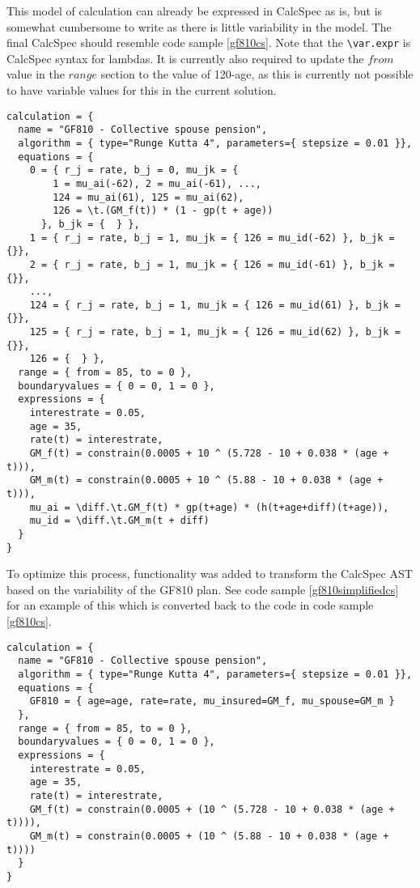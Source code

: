 This model of calculation can already be expressed in CalcSpec as is, but is somewhat cumbersome to write as there is little variability in the model.
The final CalcSpec should resemble code sample \ref{gf810cs}.
Note that the \lstinline$\var.expr$ is CalcSpec syntax for lambdas. 
It is currently also required to update the $from$ value in the $range$ section to the value of 120-age, as this is currently not possible to have variable values for this in the current solution.

\begin{lstlisting}[language=calcspec, caption=GF810 full CalcSpec, label=gf810cs]
calculation = {
  name = "GF810 - Collective spouse pension", 
  algorithm = { type="Runge Kutta 4", parameters={ stepsize = 0.01 }}, 
  equations = { 
    0 = { r_j = rate, b_j = 0, mu_jk = { 
        1 = mu_ai(-62), 2 = mu_ai(-61), ...,
        124 = mu_ai(61), 125 = mu_ai(62), 
        126 = \t.(GM_f(t)) * (1 - gp(t + age))
      }, b_jk = {  } }, 
    1 = { r_j = rate, b_j = 1, mu_jk = { 126 = mu_id(-62) }, b_jk = {}}, 
    2 = { r_j = rate, b_j = 1, mu_jk = { 126 = mu_id(-61) }, b_jk = {}}, 
    ...,
    124 = { r_j = rate, b_j = 1, mu_jk = { 126 = mu_id(61) }, b_jk = {}}, 
    125 = { r_j = rate, b_j = 1, mu_jk = { 126 = mu_id(62) }, b_jk = {}}, 
    126 = {  } }, 
  range = { from = 85, to = 0 }, 
  boundaryvalues = { 0 = 0, 1 = 0 }, 
  expressions = { 
    interestrate = 0.05, 
    age = 35, 
    rate(t) = interestrate, 
    GM_f(t) = constrain(0.0005 + 10 ^ (5.728 - 10 + 0.038 * (age + t))), 
    GM_m(t) = constrain(0.0005 + 10 ^ (5.88 - 10 + 0.038 * (age + t))), 
    mu_ai = \diff.\t.GM_f(t) * gp(t+age) * (h(t+age+diff)(t+age)), 
    mu_id = \diff.\t.GM_m(t + diff) 
  }
}
\end{lstlisting}

To optimize this process, functionality was added to transform the CalcSpec AST based on the variability of the GF810 plan.
See code sample \ref{gf810simplifiedcs} for an example of this which is converted back to the code in code sample \ref{gf810cs}.

\begin{lstlisting}[language=calcspec, caption=GF810 simplified CalcSpec, label=gf810simplifiedcs]
calculation = { 
  name = "GF810 - Collective spouse pension", 
  algorithm = { type="Runge Kutta 4", parameters={ stepsize = 0.01 }}, 
  equations = { 
    GF810 = { age=age, rate=rate, mu_insured=GM_f, mu_spouse=GM_m }
  }, 
  range = { from = 85, to = 0 }, 
  boundaryvalues = { 0 = 0, 1 = 0 }, 
  expressions = { 
    interestrate = 0.05,
    age = 35,
    rate(t) = interestrate,
    GM_f(t) = constrain(0.0005 + (10 ^ (5.728 - 10 + 0.038 * (age + t)))),
    GM_m(t) = constrain(0.0005 + (10 ^ (5.88 - 10 + 0.038 * (age + t))))
  }
}
\end{lstlisting}

